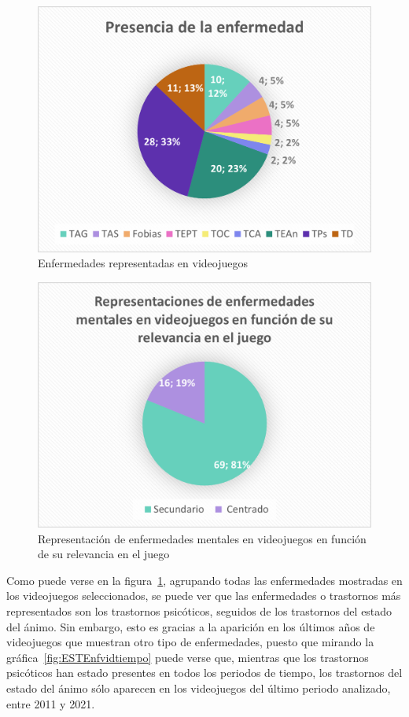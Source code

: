 \documentclass[12pt, a4paper,twoside,titlepage]{book}
\begin{document}
\begin{figure}
    \centering
    \includegraphics[width=.8\linewidth]{Graficas estudio/G2; PresenciaEnf.png}
    \caption{Enfermedades representadas en videojuegos}
    \label{fig:ESTEnfvid}
\end{figure}


\begin{figure}
    \centering
    \includegraphics[width=.8\linewidth]{Graficas estudio/G3; RepresentSecun.png}
    \caption{Representación de enfermedades mentales en videojuegos en función de su relevancia en el juego}
    \label{fig:ESTRelevancia}
\end{figure}


Como puede verse en la figura~\ref{fig:ESTEnfvid}, agrupando todas las enfermedades mostradas en los videojuegos seleccionados, se puede ver que las enfermedades o trastornos más representados son los trastornos psicóticos, seguidos de los trastornos del estado del ánimo. Sin embargo, esto es gracias a la aparición en los últimos años de videojuegos que muestran otro tipo de enfermedades, puesto que mirando la gráfica~\ref{fig:ESTEnfvidtiempo} puede verse que, mientras que los trastornos psicóticos han estado presentes en todos los periodos de tiempo, los trastornos del estado del ánimo sólo aparecen en los videojuegos del último periodo analizado, entre 2011 y 2021. 
\end{document}
